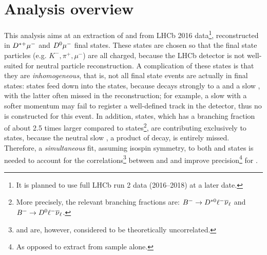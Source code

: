 \chapter{Analysis overview}
\label{ref:overview}

This analysis aims at an extraction of \RD and \RDst from
LHCb 2016 data\footnote{
    It is planned to use full LHCb run 2 data (2016--2018) at a later date.
}, reconstructed in ${{D}^{*+}}{\mu^-}$ and ${{D}^0}{\mu^-}$ final states.
These states are chosen so that the final state particles
(e.g. $K^-, \pi^+, \mu^-$) are all charged, because the LHCb detector is not
well-suited for neutral particle reconstruction.
A complication of these states is that they are \emph{inhomogeneous},
that is, not all \Dz\mun final state events are actually in \Dz\mun final
states:
\Dstarp\mun states feed down into the \Dz\mun states,
because \Dstarp decays strongly to a \Dz and a slow \pip,
with the latter often missed in the reconstruction;
for example, a slow \pip with a softer momentum may fail to register a
well-defined track in the detector, thus no \Dstarp is constructed for this
event.
In addition, \Dstarz\mun states,
which has a branching fraction of about 2.5 times larger compared to \Dz\mun
states\footnote{
    More precisely, the relevant branching fractions are:
    ${{{B}^-}} \rightarrow {\ensuremath{{D}^{*0}}} \ell^- {{\overline{\nu}}_\ell}$ and
    ${{{B}^-}} \rightarrow {\ensuremath{{D}^0}} \ell^- {{\overline{\nu}}_\ell}$.
},
are contributing exclusively to \Dz\mun states, because the neutral slow
\piz, a product of \Dstarz decay, is entirely missed.
Therefore, a \emph{simultaneous} fit,
assuming isospin symmetry,
to both \Dstarp\mun and \Dz\mun states is needed to
account for the correlations\footnote{
    \RD and \RDst are, however, considered to be theoretically uncorrelated.
} between \RD and \RDst and improve precision\footnote{
    As opposed to extract \RDst from \Dstarp\mun sample alone.
} for \RDst.

